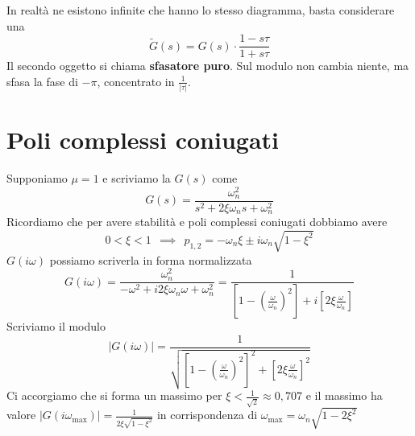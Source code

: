 In realtà ne esistono infinite che hanno lo stesso diagramma, basta considerare una
\begin{equation*}
	\tilde{G}(s) =G(s) \cdotp \frac{1-s\tau }{1+s\tau }
\end{equation*}
Il secondo oggetto si chiama \textbf{sfasatore puro}. Sul modulo non cambia niente, ma sfasa la fase di $-\pi $, concentrato in $\frac{1}{| \tau | }$.

\section{Poli complessi coniugati}

Supponiamo $\mu =1$ e scriviamo la $G(s)$ come
\begin{equation*}
	G(s) =\frac{\omega ^2_n}{s^2 +2\xi \omega _n s+\omega ^2_n}
\end{equation*}
Ricordiamo che per avere stabilità e poli complessi coniugati dobbiamo avere
\begin{equation*}
	0< \xi < 1\ \ \implies \ \ p_{1,2} =-\omega _n \xi \pm i\omega _n\sqrt{1-\xi ^2}
\end{equation*}
$G(i\omega)$ possiamo scriverla in forma normalizzata
\begin{equation*}
	G(i\omega) =\frac{\omega ^2_n}{-\omega ^2 +i2\xi \omega _n \omega +\omega ^2_n} =\frac{1}{\left[ 1-\left(\frac{\omega }{\omega _n}\right)^2\right] +i\left[ 2\xi \frac{\omega }{\omega _n}\right]}
\end{equation*}
Scriviamo il modulo
\begin{equation*}
	| G(i\omega)| =\frac{1}{\sqrt{\left[ 1-\left(\frac{\omega }{\omega _n}\right)^2\right]^2 +\left[ 2\xi \frac{\omega }{\omega _n}\right]^2}}
\end{equation*}
Ci accorgiamo che si forma un massimo per $\xi < \frac{1}{\sqrt{2}} \approx 0,707$ e il massimo ha valore $| G(i\omega _{\text{max}})| =\frac{1}{2\xi \sqrt{1-\xi ^2}}$ in corrispondenza di $\omega _{\text{max}} =\omega _n\sqrt{1-2\xi ^2}$

